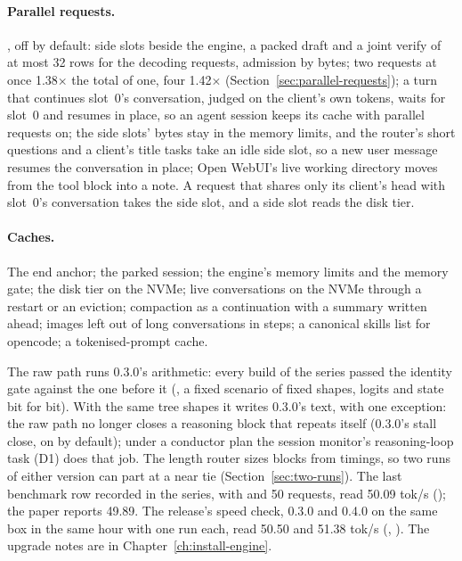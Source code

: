 \paragraph{Parallel requests.} , off by default: side slots beside the engine, a packed draft and a joint verify of at most 32 rows for the decoding requests, admission by bytes; two requests at once 1.38$\times$ the total of one, four 1.42$\times$ (Section~\ref{sec:parallel-requests}); a turn that continues slot~0's conversation, judged on the client's own tokens, waits for slot~0 and resumes in place, so an agent session keeps its cache with parallel requests on; the side slots' bytes stay in the memory limits, and the router's short questions and a client's title tasks take an idle side slot, so a new user message resumes the conversation in place; Open WebUI's live working directory moves from the tool block into a note. A request that shares only its client's head with slot~0's conversation takes the side slot, and a side slot reads the disk tier.

\paragraph{Caches.} The end anchor; the parked session; the engine's memory limits and the memory gate; the disk tier on the NVMe; live conversations on the NVMe through a restart or an eviction; compaction as a continuation with a summary written ahead; images left out of long conversations in steps; a canonical skills list for opencode; a tokenised-prompt cache.

The raw path runs 0.3.0's arithmetic: every build of the series passed the identity gate against the one before it (, a fixed scenario of fixed shapes, logits and state bit for bit). With the same tree shapes it writes 0.3.0's text, with one exception: the raw path no longer closes a reasoning block that repeats itself (0.3.0's stall close, on by default); under a conductor plan the session monitor's reasoning-loop task (D1) does that job. The length router sizes blocks from timings, so two runs of either version can part at a near tie (Section~\ref{sec:two-runs}). The last benchmark row recorded in the series, with  and 50 requests, read 50.09 tok/s (\measured); the paper reports 49.89. The release's speed check, 0.3.0 and 0.4.0 on the same box in the same hour with one run each, read 50.50 and 51.38 tok/s (\measured, ). The upgrade notes are in Chapter~\ref{ch:install-engine}.


